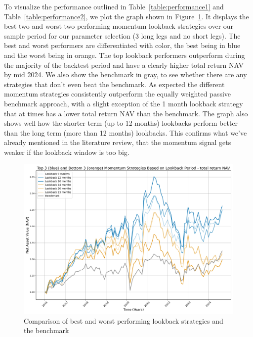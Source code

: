 \documentclass[a4paper,12pt,twoside]{article}
\begin{document}
\clearpage

To visualize the performance outlined in Table~\ref{table:performance1} and Table~\ref{table:performance2}, we plot the graph shown in Figure~\ref{fig:bm}. It displays the best two and worst two performing momentum lookback strategies over our sample period for our parameter selection (3 long legs and no short legs). The best and worst performers are differentiated with color, the best being in blue and the worst being in orange. The top lookback performers outperform during the majority of the backtest period and have a clearly higher total return NAV by mid 2024. We also show the benchmark in gray, to see whether there are any strategies that don't even beat the benchmark.  As expected the different momentum strategies consistently outperform the equally weighted passive benchmark approach, with a slight exception of the 1 month lookback strategy that at times has a lower total return NAV than the benchmark. The graph also shows well how the shorter term (up to 12 months) lookbacks perform better than the long term (more than 12 months) lookbacks. This confirms what we've already mentioned in the literature review, that the momentum signal gets weaker if the lookback window is too big.

\begin{figure}[h]
    \centering
    \includegraphics[width=15cm]{figures/fig_bm.pdf}
    \caption{Comparison of best and worst performing lookback strategies and the benchmark}
    \label{fig:bm}
\end{figure}

\clearpage
\end{document}
